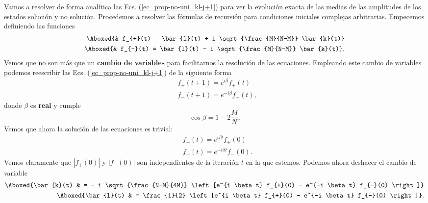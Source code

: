 \documentclass[a4paper,11pt]{book} %
\numberwithin{equation}{chapter}
\def\lc{\left[}
\def\rc{\right]}
\begin{document}
Vamos a resolver de forma analítica las Ecs. (\ref{ec_prop-no-uni_kl-j+1}) para ver la evolución exacta de las medias de las amplitudes de los estados solución y no solución. Procedemos a resolver las fórmulas de recursión para condiciones iniciales complejas arbitrarias. Empecemos definiendo las funciones
\begin{equation} \label{ec_prop-no-uni_f+-} 
\begin{aligned}
\Aboxed{& f_{+}(t) = \bar{l}(t) + i \sqrt{\frac{M}{N-M}} \bar{k}(t)} \\
\Aboxed{& f_{-}(t) = \bar{l}(t) - i \sqrt{\frac{M}{N-M}} \bar{k}(t)}. 
\end{aligned}
\end{equation}
Vemos que no son más que un \textbf{cambio de variables} para facilitarnos la resolución de las ecuaciones. Empleando este cambio de variables podemos reescribir las Ecs. (\ref{ec_prop-no-uni_kl-j+1}) de la siguiente forma
\begin{equation} 
\begin{aligned}
& f_{+}(t+1) = e^{i \beta} f_{+}(t) \\
& f_{-}(t+1) = e^{- i \beta} f_{-}(t),
\end{aligned}
\end{equation}
donde $\beta$ es \textbf{real} y cumple
\begin{equation} \label{ec_prop-no-ini_beta}
\boxed{\cos \beta = 1 - 2 \frac{M}{N}}.
\end{equation}
Vemos que ahora la solución de las ecuaciones es trivial:
\begin{equation} 
\begin{aligned}
& f_{+}(t) = e^{i \beta t} f_{+}(0) \\
& f_{-}(t) = e^{-i \beta t} f_{-}(0).
\end{aligned}
\end{equation}
Vemos claramente que $| f_{+}(0) |$ y $|f_{-}(0)|$ son independientes de la iteración $t$ en la que estemos. Podemos ahora deshacer el cambio de variable 
\begin{equation} \label{ec_prop-no-uni_sol_kl} 
\begin{aligned}
\Aboxed{\bar{k}(t) & = - i \sqrt{\frac{N-M}{4M}} \lc e^{i \beta t} f_{+}(0) - e^{-i \beta t} f_{-}(0)  \rc}   \\
\Aboxed{\bar{l}(t) & = \frac{1}{2} \lc e^{i \beta t} f_{+}(0) - e^{-i \beta t} f_{-}(0)  \rc }.  
\end{aligned}
\end{equation}
\end{document}
